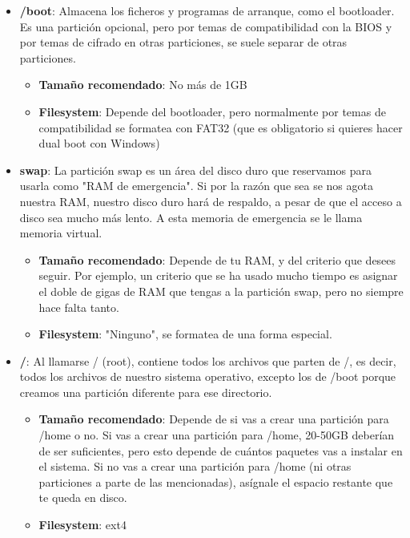 \begin{itemize}
    \item \textbf{/boot}: Almacena los ficheros y programas de arranque, como el bootloader. Es una partición opcional, pero por temas de compatibilidad con la BIOS y por temas de cifrado en otras particiones, se suele separar de otras particiones.
    \begin{itemize}
        \item \textbf{Tamaño recomendado}: No más de 1GB
        \item \textbf{Filesystem}: Depende del bootloader, pero normalmente por temas de compatibilidad se formatea con FAT32 (que es obligatorio si quieres hacer dual boot  con Windows)
    \end{itemize}

    \item \textbf{swap}: La partición swap es un área del disco duro que reservamos para usarla como "RAM de emergencia". Si por la razón que sea se nos agota nuestra RAM, nuestro disco duro hará de respaldo, a pesar de que el acceso a disco sea mucho más lento. A esta memoria de emergencia se le llama memoria virtual.
    \begin{itemize}
        \item \textbf{Tamaño recomendado}: Depende de tu RAM, y del criterio que desees seguir. Por ejemplo, un criterio que se ha usado mucho tiempo es asignar el doble de gigas de RAM que tengas a la partición swap, pero no siempre hace falta tanto.
        \item \textbf{Filesystem}: "Ninguno", se formatea de una forma especial.
    \end{itemize}

    \item \textbf{/}: Al llamarse / (root), contiene todos los archivos que parten de /, es decir, todos los archivos de nuestro sistema operativo, excepto los de /boot porque creamos una partición diferente para ese directorio.

    \begin{itemize}
        \item \textbf{Tamaño recomendado}: Depende de si vas a crear una partición para /home o no. Si vas a crear una partición para /home, 20-50GB deberían de ser suficientes, pero esto depende de cuántos paquetes vas a instalar en el sistema. Si no vas a crear una partición para /home (ni otras particiones a parte de las mencionadas), asígnale el espacio restante que te queda en disco.
        \item \textbf{Filesystem}: ext4
    \end{itemize}


\end{itemize}
